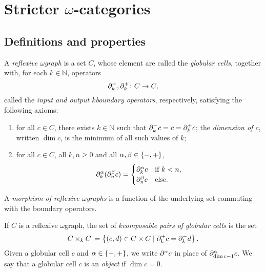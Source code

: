 \section{Stricter \texorpdfstring{$\omega$}{ω}-categories} \label{sec:stricter}

\subsection{Definitions and properties}

\begin{dfn} 
    A \emph{reflexive \( \omega \)\nbd graph} is a set \( C \), whose element are called the \emph{globular cells}, together with, for each \( k \in \mathbb{N} \), operators
    \begin{equation*}
        \partial_{k}^{-}, \partial_{k}^{+} \colon C \to C,
    \end{equation*}
    called the \emph{input and output \( k \)\nbd boundary operators}, respectively, satisfying the following axioms:
    \begin{enumerate}
        \item for all \( c \in C \), there exists \( k \in \mathbb{N} \) such that \( \partial_{k}^{-} c = c = \partial_{k}^{+} c \); the \emph{dimension of \( c \)}, written \( \dim c \), is the minimum of all such values of \( k \);
        \item for all \( c \in C \), all \( k, n \geq 0 \) and all \( \alpha, \beta \in \left\{ {-, +} \right\} \),
        \begin{equation*}
            \partial_{k}^{\alpha}(\partial_{n}^{\beta} c) = 
            \begin{cases}
                \partial_{k}^{\alpha} c & \text{if }k < n, \\
                \partial_{n}^{\beta} c& \text{else.}
            \end{cases}
        \end{equation*}
    \end{enumerate}
    A \emph{morphism of reflexive \( \omega \)\nbd graphs} is a function of the underlying set commuting with the boundary operators.

    If \( C \) is a reflexive \( \omega \)\nbd graph, the set of \emph{\( k \)\nbd composable pairs of globular cells} is the set 
    \begin{equation*}
        C \times_k C \coloneqq \left\{ {(c, d) \in C \times C \mid \partial_{k}^{+} c = \partial_{k}^{-} d} \right\}.
    \end{equation*}
    Given a globular cell \( c \) and \( \alpha \in \left\{ {-, +} \right\} \), we write \( \partial_{}^{\alpha} c \) in place of \( \partial_{\dim c - 1}^{\alpha} c \).
    We say that a globular cell \( c \) is an \emph{object} if \( \dim c = 0 \). 
\end{dfn}


